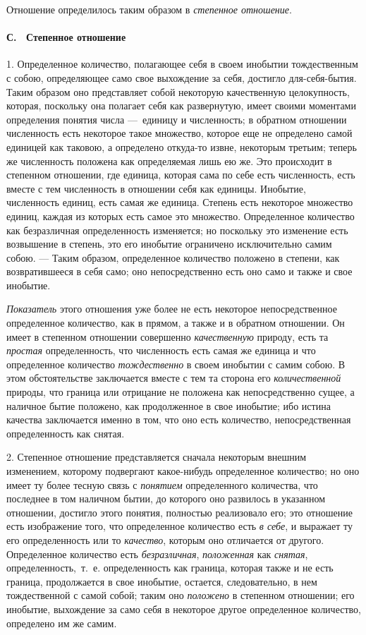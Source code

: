 Отношение определилось таким образом в {\em степенное
отношение}.

\paragraph[С. \ Степенное отношение]{С. \ Степенное отношение}
1. Определенное количество, полагающее себя в
своем инобытии тождественным с собою, определяющее само свое выхождение за
себя, достигло для-себя-бытия. Таким образом оно представляет собой
некоторую качественную целокупность, которая, поскольку она полагает себя
как развернутую, имеет своими моментами определения понятия числа —~единицу
и численность; в обратном отношении численность есть некоторое такое
множество, которое еще не определено самой единицей как таковою, а
определено откуда-то извне, некоторым третьим; теперь же численность
положена как определяемая лишь ею же. Это происходит в степенном отношении,
где единица, которая сама по себе есть численность, есть вместе с тем
численность в отношении себя как единицы. Инобытие, численность единиц,
есть самая же единица. Степень есть некоторое множество единиц, каждая из
которых есть самое это множество. Определенное количество как безразличная
определенность изменяется; но поскольку это изменение есть возвышение в
степень, это его инобытие ограничено исключительно самим собою. — Таким
образом, определенное количество положено в степени, как возвратившееся в
себя само; оно непосредственно есть оно само и также и свое инобытие.

{\em Показатель} этого отношения уже более не есть
некоторое непосредственное определенное количество, как в прямом, а также и
в обратном отношении. Он имеет в степенном отношении совершенно
{\em качественную} природу, есть та
{\em простая} определенность, что численность есть
самая же единица и что определенное количество
{\em тождественно} в своем инобытии с самим собою. В
этом обстоятельстве заключается вместе с тем та сторона его
{\em количественной} природы, что граница или отрицание
не положена как непосредственно сущее, а наличное бытие положено, как
продолженное в свое инобытие; ибо истина качества заключается именно в том,
что оно есть количество, непосредственная определенность как снятая.

2. Степенное отношение представляется сначала некоторым внешним изменением,
которому подвергают какое-нибудь определенное количество; но оно имеет ту
более тесную связь с {\em понятием} определенного
количества, что последнее в том наличном бытии, до которого оно развилось в
указанном отношении, достигло этого понятия, полностью реализовало его; это
отношение есть изображение того, что определенное количество есть
{\em в себе}, и выражает ту его определенность или то
{\em качество}, которым оно отличается от другого.
Определенное количество есть {\em безразличная},
{\em положенная} как {\em снятая},
определенность,~т.~е. определенность как граница, которая также и не есть
граница, продолжается в свое инобытие, остается, следовательно, в нем
тождественной с самой собой; таким оно {\em положено} в
степенном отношении; его инобытие, выхождение за само себя в некоторое
другое определенное количество, определено им же самим.

